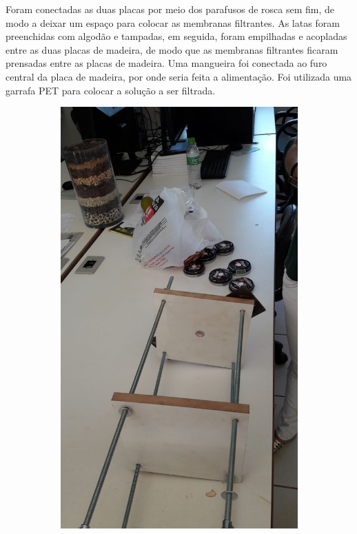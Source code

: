 Foram conectadas as duas placas por meio dos parafusos de rosca sem fim, de modo
a deixar um espaço para colocar as membranas filtrantes. As latas foram
preenchidas com algodão e tampadas, em seguida, foram empilhadas e acopladas
entre as duas placas de madeira, de modo que as membranas filtrantes ficaram
prensadas entre as placas de madeira. Uma mangueira foi conectada ao furo
central da placa de madeira, por onde seria feita a alimentação. Foi utilizada
uma garrafa PET para colocar a solução a ser filtrada.

\begin{figure}
  \begin{subfigure}[H]{0.4\textwidth}
    \includegraphics[width=\textwidth]{figuras/montagem1.png}

\end{subfigure}
\end{figure}
